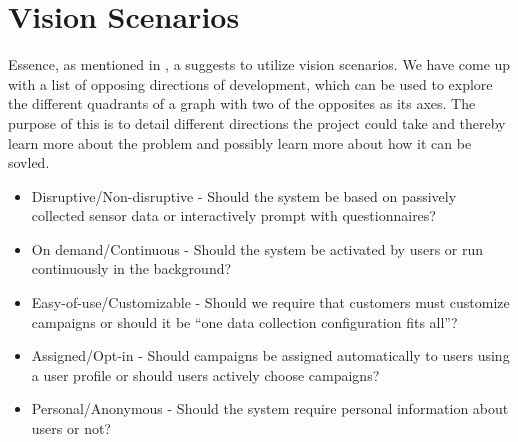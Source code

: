 \section{Vision Scenarios}
\label{sec:vision_scenarios}
Essence, as mentioned in , a suggests to utilize vision scenarios. We have come up with a list of opposing directions of development, which can be used to explore the different quadrants of a graph with two of the opposites as its axes. The purpose of this is to detail different directions the project could take and thereby learn more about the problem and possibly learn more about how it can be sovled. 


\begin{itemize}[itemsep=0.1em]
    \item Disruptive/Non-disruptive - Should the system be based on passively collected sensor data or interactively prompt with questionnaires? %
    \item On demand/Continuous - Should the system be activated by users or run continuously in the background? %
    \item Easy-of-use/Customizable - Should we require that customers must customize campaigns or should it be ``one data collection configuration fits all''? %
    \item Assigned/Opt-in - Should campaigns be assigned automatically to users using a user profile or should users actively choose campaigns? %
    \item Personal/Anonymous - Should the system require personal information about users or not? %
\end{itemize}

